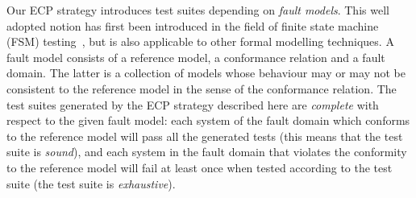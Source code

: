 Our ECP strategy
introduces test suites depending on {\it fault models}. This well adopted notion has first been 
introduced in the field of finite state machine (FSM) testing~\cite{petrenko1996}, but is also applicable
to other formal modelling techniques. A fault model consists of a reference model, a conformance relation and a fault domain. The latter is a collection of models whose behaviour may or may not be
consistent to the reference model in the sense of the conformance relation. The test suites generated 
by the ECP strategy described here are {\it complete} with respect to the given fault model: each
system of the fault domain which conforms to the reference model will pass all the generated tests
(this means that the test suite is {\it sound}), and each system in the fault domain that violates the
conformity to the reference model will fail at least  once when tested according to the test suite (the test suite is {\it exhaustive}). 









